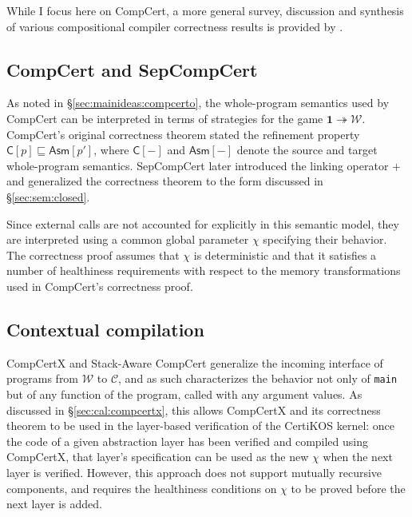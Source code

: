 \documentclass[11pt,oneside]{book}
\theoremstyle{definition}
\newcommand{\kw}[1]{\ensuremath{ \mathsf{#1} }}
\newcommand{\refby}{\sqsubseteq} %
\begin{document}
While I focus here on CompCert,
a more general survey,
discussion and synthesis of various
compositional compiler correctness results
is provided by \citet{next700}.

\subsection{CompCert and SepCompCert} %

As noted in \S\ref{sec:mainideas:compcerto},
the whole-program semantics used by CompCert
can be interpreted in terms of strategies for the game
$\mathbf{1} \twoheadrightarrow \mathcal{W}$.
CompCert's original correctness theorem
stated the refinement property
$\kw{C}[p] \refby \kw{Asm}[p']$,
where $\kw{C}[-]$ and $\kw{Asm}[-]$
denote the source and target whole-program semantics.
SepCompCert \citep{sepcompcert}
later introduced the linking operator $+$
and generalized the correctness theorem to
the form discussed in \S\ref{sec:sem:closed}.

Since external calls are not accounted for explicitly
in this semantic model,
they are interpreted %
using a common global parameter $\chi$
specifying their behavior.
The correctness proof assumes that $\chi$ is deterministic
and that it satisfies a number of healthiness requirements
with respect to the memory transformations
used in CompCert's correctness proof.


\subsection{Contextual compilation} \label{sec:compcertx} %

CompCertX \citep{popl15} and
Stack-Aware CompCert \citep{stackaware}
generalize
the incoming interface of programs
from $\mathcal{W}$ to $\mathcal{C}$,
and as such characterizes the behavior
not only of \texttt{main}
but of any function of the program,
called with any argument values.
As discussed in \S\ref{sec:cal:compcertx},
this allows CompCertX and its correctness theorem
to be used in the layer-based verification of
the CertiKOS kernel:
once the code of a given abstraction layer has been verified
and compiled using CompCertX,
that layer's specification can be used as the new $\chi$
when the next layer is verified.
However,
this approach does not support
mutually recursive components,
and requires the healthiness conditions on $\chi$
to be proved before the next layer is added.
\end{document}
